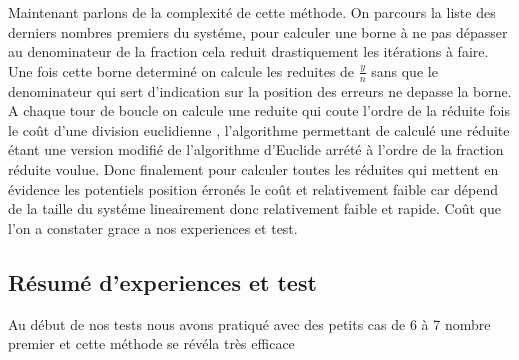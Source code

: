 \documentclass[a4paper, 11pt]{article}
\begin{document}
Maintenant parlons de la complexité de cette méthode. 
On parcours la liste des derniers nombres premiers du systéme, pour calculer une borne à ne pas dépasser au denominateur de la fraction cela reduit drastiquement les itérations à faire.
Une fois cette borne determiné on calcule les reduites de  $\frac{y}{n}$ sans que le denominateur qui sert d'indication sur la position des erreurs ne depasse la borne.
A chaque tour de boucle on calcule une reduite qui coute l'ordre de la réduite fois le coût d'une division euclidienne  ,
l'algorithme permettant de calculé une réduite étant une version modifié de l'algorithme d'Euclide arrété à l'ordre de la fraction réduite voulue.
Donc finalement pour calculer toutes les réduites qui mettent en évidence les potentiels position érronés le coût et relativement faible car dépend de la taille du systéme lineairement donc relativement faible et rapide.
Coût que l'on a constater grace a nos experiences et test.






\newpage
\subsection{Résumé d'experiences et test}
Au début de nos tests nous avons pratiqué avec des petits cas de 6 à 7 nombre premier et cette méthode se révéla très efficace 
\end{document}

